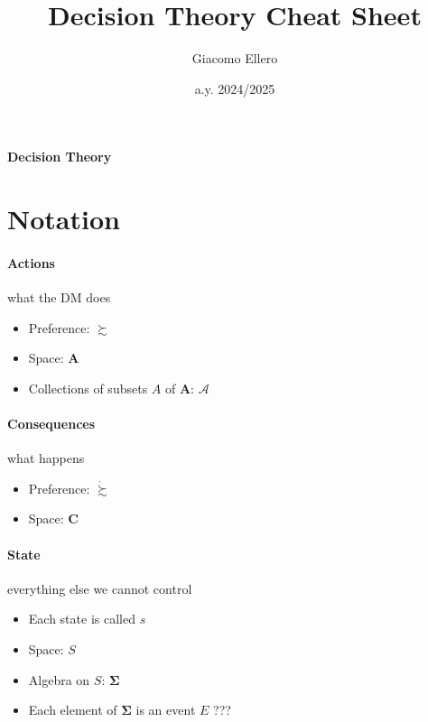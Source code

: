 \documentclass[landscape, 12pt]{extarticle}
\title{Decision Theory Cheat Sheet}
\author{Giacomo Ellero}
\date{a.y. 2024/2025}
\begin{document}
\begin{center}
	\huge
	\bf
	Decision Theory
\end{center}

\setlength{\columnsep}{1cm}
\setlength{\columnseprule}{1pt}
\def\columnseprulecolor{\color{blue}}

\vspace{0.25cm}

\section{Notation}

\begin{multicols}{2}

	\paragraph{Actions} what the DM does
	\begin{itemize}
		\item Preference: $\succsim$
		\item Space: $\bm A$
		\item Collections of subsets $A$ of $\bm A$: $\mathcal A$
	\end{itemize}


	\paragraph{Consequences} what happens
	\begin{itemize}
		\item Preference: $\dot \succsim$
		\item Space: $\bm C$
	\end{itemize}


	\paragraph{State} everything else we cannot control
	\begin{itemize}
		\item Each state is called $s$
		\item Space: $S$
		\item Algebra on $S$: $\bm \Sigma$
		\item Each element of $\bm \Sigma$ is an event $E$ ???
	\end{itemize}


\end{multicols}
\end{document}
